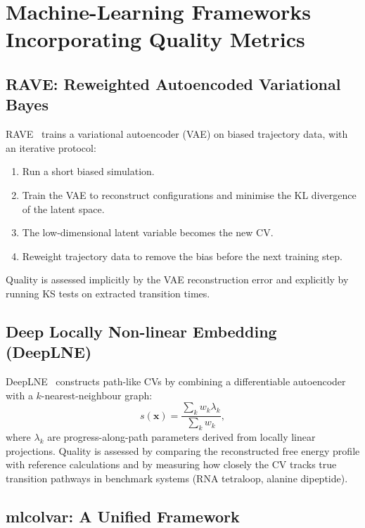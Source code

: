\documentclass[12pt, a4paper]{article}
\begin{document}
\section{Machine-Learning Frameworks Incorporating Quality Metrics}
\label{sec:ml}

\subsection{RAVE: Reweighted Autoencoded Variational Bayes}

RAVE~\citep{Tiwary2018RAVE} trains a variational autoencoder (VAE) 
on biased trajectory data, with an iterative protocol:
\begin{enumerate}[noitemsep]
  \item Run a short biased simulation.
  \item Train the VAE to reconstruct configurations and minimise the 
        KL divergence of the latent space.
  \item The low-dimensional latent variable becomes the new CV.
  \item Reweight trajectory data to remove the bias before 
        the next training step.
\end{enumerate}
Quality is assessed implicitly by the VAE reconstruction error and 
explicitly by running KS tests on extracted transition times.

\subsection{Deep Locally Non-linear Embedding (DeepLNE)}

DeepLNE~\citep{DeepLNE2024} constructs path-like CVs by combining a 
differentiable autoencoder with a $k$-nearest-neighbour graph:
\begin{equation}
  s(\mathbf{x}) = \frac{\sum_k w_k \lambda_k}{\sum_k w_k},
\end{equation}
where $\lambda_k$ are progress-along-path parameters derived from 
locally linear projections.  Quality is assessed by comparing the 
reconstructed free energy profile with reference calculations and by 
measuring how closely the CV tracks true transition pathways 
in benchmark systems (RNA tetraloop, alanine dipeptide).

\subsection{mlcolvar: A Unified Framework}
\end{document}

